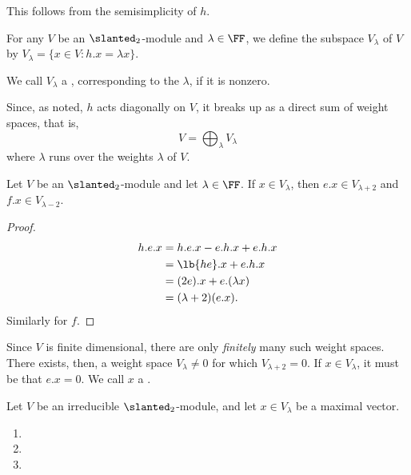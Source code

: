 \documentclass{article}
\DeclarePairedDelimiter\lb\lbrack\rbrack
\let\sl\slanted
\newcommand*\sl{\ensuremath{\mathfrak{sl}}}
\begin{document}
This follows from the semisimplicity of $h$.

\begin{definition}
    For any $V$ be an $\sl_2$-module and $\lambda \in \FF$, we define the subspace $V_\lambda$ of $V$ by $V_\lambda = \{x \in V: h.x = \lambda x\}$.

    We call $V_\lambda$ a , corresponding to the  $\lambda$, if it is nonzero.
\end{definition}

Since, as noted, $h$ acts diagonally on $V$, it breaks up as a direct sum of weight spaces, that is, 
\[
    V
    =
    \bigoplus_\lambda
    V_\lambda
\]
where $\lambda$ runs over the weights $\lambda$ of $V$.

\begin{lemma}
    Let $V$ be an $\sl_2$-module and let $\lambda \in \FF$.
    If $x \in V_\lambda$, then $e.x \in V_{\lambda+2}$ and $f.x \in V_{\lambda-2}$.
\end{lemma}
\begin{proof}
    \begin{align*}
        h.e.x
        &=
        h.e.x - e.h.x + e.h.x
        \\
        &=
        \lb{he}.x + e.h.x
        \\
        &=
        (2e).x + e.(\lambda x)
        \\
        &=
        (\lambda+2)(e.x).
    \end{align*}
    Similarly for $f$.
\end{proof}

Since $V$ is finite dimensional, there are only \emph{finitely} many such weight spaces.
There exists, then, a weight space $V_\lambda \neq 0$ for which $V_{\lambda+2} = 0$.
If $x \in V_\lambda$, it must be that $e.x = 0$.
We call $x$ a .

\begin{lemma}
    Let $V$ be an irreducible $\sl_2$-module, and let $x \in V_\lambda$ be a maximal vector.
    \begin{enumerate}
        [label=(\roman*)]
        \item
        \item 
        \item 
    \end{enumerate}
\end{lemma}

\begin{theorem}
\end{theorem}
\end{document}
